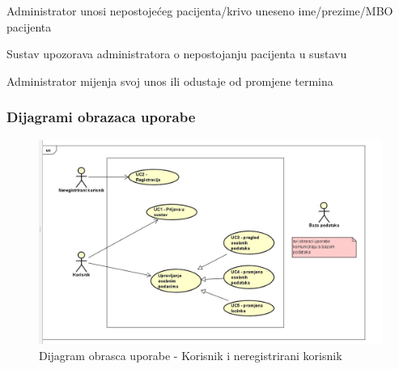 \begin{packed_item}
					\item[] \begin{packed_item}
						
						\item[3.a] Administrator unosi nepostojećeg pacijenta/krivo uneseno ime/prezime/MBO pacijenta
						\item[] \begin{packed_enum}
							\item Sustav upozorava administratora o nepostojanju pacijenta u sustavu
							\item Administrator mijenja svoj unos ili odustaje od promjene termina
						\end{packed_enum}
					\end{packed_item}
				\end{packed_item}
				
				
				\subsubsection{Dijagrami obrazaca uporabe}
					
					\begin{figure}[H]
						\includegraphics[scale=0.3]{slike/dijagram_obrasca_uporabe1.JPG} %
						\centering
						\caption{Dijagram obrasca uporabe - Korisnik i neregistrirani korisnik}
						\label{fig:dijagram_UC1}
					\end{figure}
					
